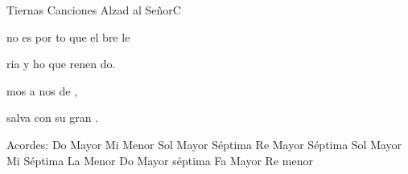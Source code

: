 \documentclass[12pt, spanish]{book}
\begin{document}
\begin{song}{Tiernas Canciones Alzad al Señor}{C}
\begin{SBOpGroup}
            no es por to que el bre le 

            ria y ho que renen do.

            mos a  nos de ,

             salva con su gran .
        \end{SBOpGroup}

        \ifChordBk
        \begin{SBOpGroup}
            Acordes:
            \upchord{\C}\qquad Do Mayor \hfill
            \upchord{\Em}\qquad Mi Menor \hfill\null\break
            \upchord{\Gseven}\qquad Sol Mayor S\'eptima \hfill
            \upchord{\Dseven}\qquad Re Mayor S\'eptima \hfill\null\break
            \upchord{\G}\qquad Sol Mayor \hfill
            \upchord{\Eseven}\qquad Mi S\'eptima \hfill\null\break
            \upchord{\Am}\qquad La Menor \hfill
            \upchord{\Cseven}\qquad Do Mayor s\'eptima \hfill\null\break
            \upchord{\F}\qquad Fa Mayor \hfill
            \upchord{\Dm}\qquad Re menor  \hfill\null\break
        \end{SBOpGroup}
        \fi
    \end{song}
\end{document}
